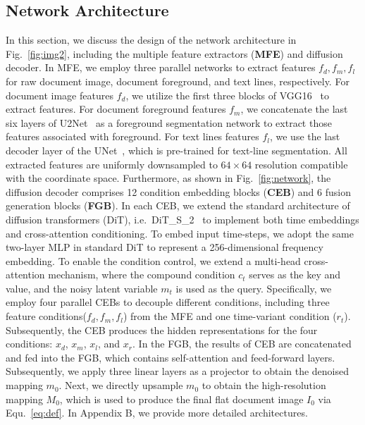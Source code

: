 \subsection{Network Architecture}
\label{sec:method32}
In this section, we discuss the design of the network architecture in Fig.~\ref{fig:img2}, including the multiple feature extractors (\textbf{MFE}) and diffusion decoder. In MFE, we employ three parallel networks to extract features $f_d, f_m, f_l$ for raw document image, document foreground, and text lines, respectively. For document image features $f_d$, we utilize the first three blocks of VGG16~\cite{simonyan2014very} to extract features. For document foreground features $f_m$, we concatenate the last six layers of U2Net~\cite{qin_u2net_2020} as a foreground segmentation network to extract those features associated with foreground. For text lines features $f_l$, we use the last decoder layer of the UNet~\cite{ronneberger_unet_2015}, which is pre-trained for text-line segmentation. All extracted features are uniformly downsampled to $64\times64$ resolution compatible with the coordinate space.
Furthermore, as shown in Fig.~\ref{fig:network}, the diffusion decoder comprises 12 condition embedding blocks (\textbf{CEB}) and 6 fusion generation blocks (\textbf{FGB}). In each CEB, we extend the standard architecture of diffusion transformers (DiT), i.e.~DiT\_S\_2~\cite{Peebles_2023_dit} to implement both time embeddings and cross-attention conditioning.
To embed input time-steps, we adopt the same two-layer MLP in standard DiT to represent a 256-dimensional frequency embedding. To enable the condition control, we extend a multi-head cross-attention mechanism, where the compound condition $c_t$ serves as the key and value, and the noisy latent variable $m_t$ is used as the query. Specifically, we employ four parallel CEBs to decouple different conditions, including three feature conditions($f_d, f_m, f_l$) from the MFE and one time-variant condition ($r_t$). 
Subsequently, the CEB produces the hidden representations for the four conditions: $x_d$, $x_m$, $x_l$, and $x_r$.
In the FGB, the results of CEB are concatenated and fed into the FGB, which contains self-attention and feed-forward layers. Subsequently, we apply three linear layers as a projector to obtain the denoised mapping $m_0$. Next, we directly upsample $m_0$  to obtain the high-resolution mapping $M_0$, which is used to produce the final flat document image $I_0$ via Equ.~\ref{eq:def}. In Appendix B, we provide more detailed architectures.


